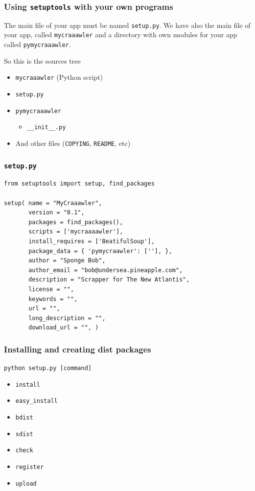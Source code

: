 \documentclass[11pt]{beamer}
\begin{document}
\begin{frame}[fragile]\frametitle{Using \texttt{setuptools} with your own programs}
\label{sec-1_3}


The main file of your app must be named \texttt{setup.py}. We have also the
main file of your app, called \texttt{mycraaawler} and a directory with own
modules for your app called \texttt{pymycraaawler}.

So this is the sources tree
\begin{itemize}
\item \texttt{mycraaawler} (Python script)
\item \texttt{setup.py}
\item \texttt{pymycraaawler}

\begin{itemize}
\item \texttt{\_\_init\_\_.py}
\end{itemize}

\item And other files (\texttt{COPYING}, \texttt{README}, etc)
\end{itemize}
\end{frame}
\begin{frame}[fragile]\frametitle{\texttt{setup.py}}
\label{sec-1_4}

\begin{lstlisting}
from setuptools import setup, find_packages

setup( name = "MyCraaawler",
       version = "0.1",
       packages = find_packages(),
       scripts = ['mycraaaawler'],
       install_requires = ['BeatifulSoup'],
       package_data = { 'pymycraawler': [''], },
       author = "Sponge Bob",
       author_email = "bob@undersea.pineapple.com",
       description = "Scrapper for The New Atlantis",
       license = "",
       keywords = "",
       url = "",
       long_description = "",
       download_url = "", )
\end{lstlisting}
\end{frame}
\begin{frame}[fragile]\frametitle{Installing and creating dist packages}
\label{sec-1_5}


\texttt{python setup.py [command]}

\begin{itemize}
\item \texttt{install}
\item \texttt{easy\_install}
\item \texttt{bdist}
\item \texttt{sdist}
\item \texttt{check}
\item \texttt{register}
\item \texttt{upload}
\end{itemize}
\end{frame}
\end{document}
